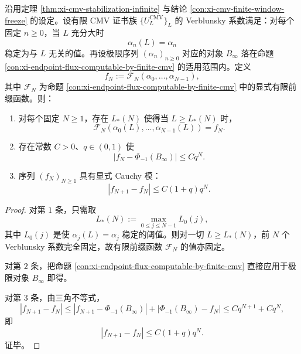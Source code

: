 \begin{corollary}\label{cor:xi-time-part28c-stabilized-endpoint-flux-cauchy-modulus}
沿用定理 \ref{thm:xi-cmv-stabilization-infinite} 与结论 \ref{con:xi-cmv-finite-window-freeze} 的设定。设有限 CMV 证书族 \(\{U_L^{\mathrm{CMV}}\}_L\) 的 Verblunsky 系数满足：对每个固定 \(n\ge 0\)，当 \(L\) 充分大时
\[
\alpha_n(L)=\alpha_n
\]
稳定为与 \(L\) 无关的值。再设极限序列 \((\alpha_n)_{n\ge 0}\) 对应的对象 \(B_\infty\) 落在命题 \ref{con:xi-endpoint-flux-computable-by-finite-cmv} 的适用范围内。定义
\[
f_N:=\mathcal F_N(\alpha_0,\dots,\alpha_{N-1}),
\]
其中 \(\mathcal F_N\) 为命题 \ref{con:xi-endpoint-flux-computable-by-finite-cmv} 中的显式有限前缀函数。则：
\begin{enumerate}
  \item 对每个固定 \(N\ge 1\)，存在 \(L_\ast(N)\) 使得当 \(L\ge L_\ast(N)\) 时，
  \[
  \mathcal F_N(\alpha_0(L),\dots,\alpha_{N-1}(L))=f_N.
  \]
  \item 存在常数 \(C>0\)、\(q\in(0,1)\) 使
  \[
  \boxed{\;
  |f_N-\Phi_{-1}(B_\infty)|\le Cq^N.\;}
  \]
  \item 序列 \((f_N)_{N\ge 1}\) 具有显式 Cauchy 模：
  \[
  \boxed{\;
  |f_{N+1}-f_N|\le C(1+q)q^N.\;}
  \]
\end{enumerate}
\end{corollary}
\begin{proof}
对第 \(1\) 条，只需取
\[
L_\ast(N):=\max_{0\le j\le N-1}L_0(j),
\]
其中 \(L_0(j)\) 是使 \(\alpha_j(L)=\alpha_j\) 稳定的阈值。则对一切 \(L\ge L_\ast(N)\)，前 \(N\) 个 Verblunsky 系数完全固定，故有限前缀函数 \(\mathcal F_N\) 的值亦固定。

对第 \(2\) 条，把命题 \ref{con:xi-endpoint-flux-computable-by-finite-cmv} 直接应用于极限对象 \(B_\infty\) 即得。

对第 \(3\) 条，由三角不等式，
\[
|f_{N+1}-f_N|
\le |f_{N+1}-\Phi_{-1}(B_\infty)|
+|\Phi_{-1}(B_\infty)-f_N|
\le Cq^{N+1}+Cq^N,
\]
即
\[
|f_{N+1}-f_N|\le C(1+q)q^N.
\]
证毕。
\end{proof}

